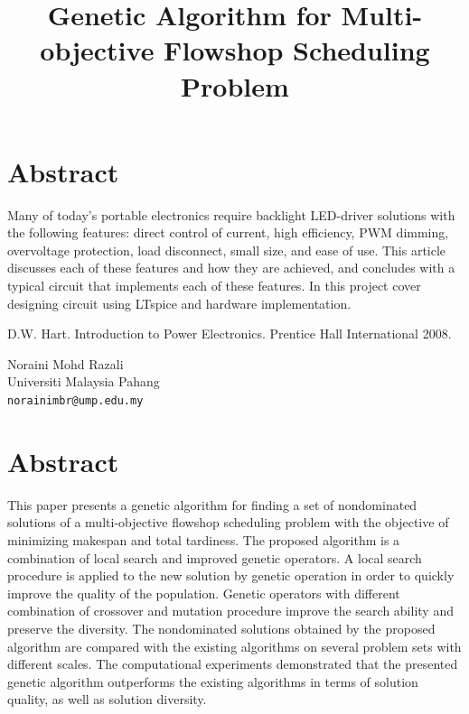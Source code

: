 \documentclass[article,A4,11pt]{llncs}%
\begin{document}
\section*{Abstract}
Many of today’s portable electronics require backlight LED-driver solutions with the following features: direct control of current, high efficiency, PWM dimming, overvoltage protection, load disconnect, small size, and ease of use. This article discusses each of these features and how they are achieved, and concludes with a typical circuit that implements each of these features. In this project cover designing circuit using LTspice and hardware implementation.


\begin{thebibliography}{10}
{\sc D.W. Hart}. {Introduction to Power Electronics}. Prentice Hall International 2008.
\end{thebibliography}

\title{Genetic Algorithm for Multi-objective Flowshop Scheduling Problem}
 \author{} \institute{}
\maketitle
\begin{center}
{\large Noraini Mohd Razali}\\
Universiti Malaysia Pahang\\
{\tt norainimbr@ump.edu.my}
\end{center}

\section*{Abstract}
This paper presents a genetic algorithm for finding a set of nondominated solutions of a multi-objective flowshop scheduling problem with the objective of minimizing makespan and total tardiness. The proposed algorithm is a combination of local search and improved genetic operators. A local search procedure is applied to the new solution by genetic operation in order to quickly improve the quality of the population. Genetic operators with different combination of crossover and mutation procedure improve the search ability and preserve the diversity. The nondominated solutions obtained by the proposed algorithm are compared with the existing algorithms on several problem sets with different scales. The computational experiments demonstrated that the presented genetic algorithm outperforms the existing algorithms in terms of solution quality, as well as solution diversity.
\end{document}
